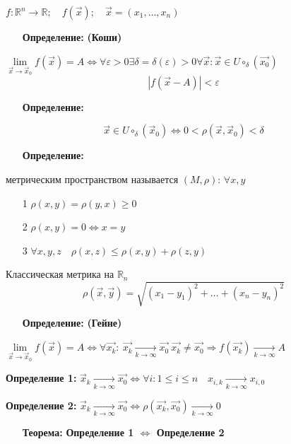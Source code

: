 \documentclass[12pt, letterpaper, twoside]{article}
\begin{document}
    $f: \mathbb{R}^n\to \mathbb{R};\quad f(\vec{x}); \quad \vec{x} = (x_1, \dots, x_n)$\\
    \begin{enumerate}
        \item[{\textbf{Определение:}}] \textbf{(Коши)}
    \end{enumerate}
$\lim\limits_{\vec{x}\to \vec{x}_0} f(\vec{x}) = A\Leftrightarrow \forall \varepsilon > 0 \exists \delta = \delta(\varepsilon)>0 \forall \vec{x}: \vec{x} \in U\circ_\delta (\vec{x_0})$
$$|f(\vec{x} - A)| < \varepsilon$$
\begin{enumerate}
    \item [\textbf{Определение:}] 
\end{enumerate}
$$\vec{x} \in U\circ_\delta (\vec{x}_0) \Leftrightarrow 0 < \rho(\vec{x}, \vec{x}_0) < \delta$$
\begin{enumerate}
    \item[\textbf{Определение:}] 
\end{enumerate}
    метрическим пространством называется $(M, \rho)$: $\forall x, y$
\begin{enumerate}
    \item[1] $\rho (x, y) = \rho (y ,x) \geq 0$
    \item[2] $\rho (x, y) = 0 \Leftrightarrow x = y$
    \item[3] $\forall x, y, z\quad \rho (x, z) \leq \rho (x, y) + \rho (z, y)$
\end{enumerate}
Классическая метрика на $\mathbb{R}_n$
$$\rho(\vec{x}, \vec{y}) = \sqrt{(x_1 - y_1)^2 + \dots + (x_n - y_n)^2}$$
\begin{enumerate}
    \item[\textbf{Определение:}] \textbf{(Гейне)}
\end{enumerate}
$\lim\limits_{\vec{x}\to \vec{x}_0} f(\vec{x}) = A\Leftrightarrow\forall \vec{x_k}:\ \vec{x_k}\underset{k\to\infty}{\longrightarrow} \vec{x_0}\ \vec{x_k} \neq \vec{x_0} \Rightarrow f(\vec{x_k})\underset{k\to\infty}{\longrightarrow}A$

\textbf{Определение 1:}
$\vec{x}_k\underset{k\to\infty}{\longrightarrow} \vec{x_0} \Leftrightarrow \forall i: 1 \leq i \leq n\quad x_{i, k} \underset{k\to\infty}{\longrightarrow} x_{i, 0}$

\textbf{Определение 2:}
$\vec{x}_k\underset{k\to\infty}{\longrightarrow} \vec{x_0} \Leftrightarrow \rho({\vec{x_k}, \vec{x_0}}) \underset{k\to\infty}{\longrightarrow} 0$
\begin{enumerate}
    \item[\textbf{Теорема:}] \textbf{Определение 1 $\Leftrightarrow$ Определение 2}
\end{enumerate}
\end{document}
